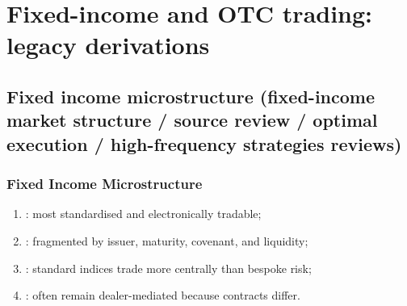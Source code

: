 \documentclass[a4paper,oneside,openany]{book}
\begin{document}
\chapter*{Fixed-income and OTC trading: legacy derivations}

\section*{Fixed income microstructure (fixed-income market structure / source review / optimal execution / high-frequency strategies reviews)}

\subsection*{Fixed Income Microstructure}

\begin{taxonomy} 
\begin{enumerate}[label=\roman*.]
\setlength{\itemsep}{0pt}
\item {}: most standardised and electronically tradable;
\item {}: fragmented by issuer, maturity, covenant, and liquidity;
\item {}: standard indices trade more centrally than bespoke risk;
\item {}: often remain dealer-mediated because contracts differ.
\end{enumerate}
\end{taxonomy}
\end{document}

